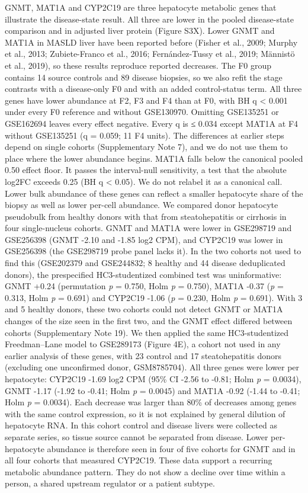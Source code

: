 GNMT, MAT1A and CYP2C19 are three hepatocyte metabolic genes that illustrate the disease-state result. All three are lower in the pooled disease-state comparison and in adjusted liver protein (Figure S3X). Lower GNMT and MAT1A in MASLD liver have been reported before (Fisher et al., 2009; Murphy et al., 2013; Zubiete-Franco et al., 2016; Fernández-Tussy et al., 2019; Männistö et al., 2019), so these results reproduce reported decreases. The F0 group contains 14 source controls and 89 disease biopsies, so we also refit the stage contrasts with a disease-only F0 and with an added control-status term. All three genes have lower abundance at F2, F3 and F4 than at F0, with BH q \textless{} 0.001 under every F0 reference and without GSE130970. Omitting GSE135251 or GSE162694 leaves every effect negative. Every q is ≤ 0.034 except MAT1A at F4 without GSE135251 (q = 0.059; 11 F4 units). The differences at earlier steps depend on single cohorts (Supplementary Note 7), and we do not use them to place where the lower abundance begins. MAT1A falls below the canonical pooled 0.50 effect floor. It passes the interval-null sensitivity, a test that the absolute log2FC exceeds 0.25 (BH q \textless{} 0.05). We do not relabel it as a canonical call. Lower bulk abundance of these genes can reflect a smaller hepatocyte share of the biopsy as well as lower per-cell abundance. We compared donor hepatocyte pseudobulk from healthy donors with that from steatohepatitis or cirrhosis in four single-nucleus cohorts. GNMT and MAT1A were lower in GSE298719 and GSE256398 (GNMT -2.10 and -1.85 log2 CPM), and CYP2C19 was lower in GSE256398 (the GSE298719 probe panel lacks it). In the two cohorts not used to find this (GSE202379 and GSE244832; 8 healthy and 44 disease deduplicated donors), the prespecified HC3-studentized combined test was uninformative: GNMT +0.24 (permutation \emph{p} = 0.750, Holm \emph{p} = 0.750), MAT1A -0.37 (\emph{p} = 0.313, Holm \emph{p} = 0.691) and CYP2C19 -1.06 (\emph{p} = 0.230, Holm \emph{p} = 0.691). With 3 and 5 healthy donors, these two cohorts could not detect GNMT or MAT1A changes of the size seen in the first two, and the GNMT effect differed between cohorts (Supplementary Note 19). We then applied the same HC3-studentized Freedman--Lane model to GSE289173 (Figure 4E), a cohort not used in any earlier analysis of these genes, with 23 control and 17 steatohepatitis donors (excluding one unconfirmed donor, GSM8785704). All three genes were lower per hepatocyte: CYP2C19 -1.69 log2 CPM (95\% CI -2.56 to -0.81; Holm \emph{p} = 0.0034), GNMT -1.17 (-1.92 to -0.41; Holm \emph{p} = 0.0045) and MAT1A -0.92 (-1.44 to -0.41; Holm \emph{p} = 0.0034). Each decrease was larger than 80\% of decreases among genes with the same control expression, so it is not explained by general dilution of hepatocyte RNA. In this cohort control and disease livers were collected as separate series, so tissue source cannot be separated from disease. Lower per-hepatocyte abundance is therefore seen in four of five cohorts for GNMT and in all four cohorts that measured CYP2C19. These data support a recurring metabolic abundance pattern. They do not show a decline over time within a person, a shared upstream regulator or a patient subtype.

